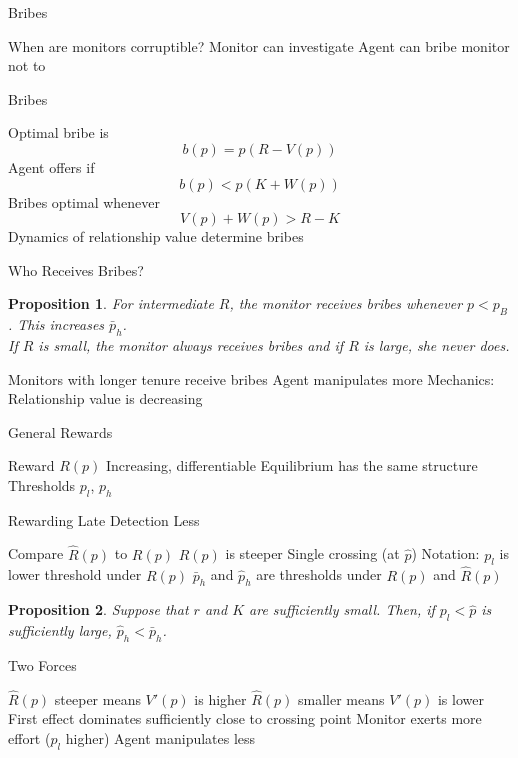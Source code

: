 \documentclass[usenames,dvipsnames]{beamer}
\newcommand{\bo}{\begin{outline}}
\newcommand{\eo}{\end{outline}}
\newtheorem{proposition}{Proposition}
\begin{document}
\begin{frame}{Bribes}
\bo
\1 When are monitors corruptible? 
\1 Monitor can investigate
\1 Agent can bribe monitor not to 
\eo
\bigskip

\end{frame}

\begin{frame}{Bribes}
\bo
\1 Optimal bribe is
\[
b(p) = p(R-V(p))
\]
\1 Agent offers if
\[
b(p) < p(K+W(p))
\]
\1 Bribes optimal whenever
\[
V(p)+W(p) > R-K
\]
\1 Dynamics of relationship value determine bribes
\eo
\end{frame}

\begin{frame}{Who Receives Bribes?}
\begin{proposition}
        For intermediate $R$, the monitor receives bribes whenever $p<p_B$. This increases $\bar{p}_h$. \\
        If $R$ is small, the monitor always receives bribes and if $R$ is large, she never does.
\end{proposition}
\bo
\1 Monitors with longer tenure receive bribes
\1 Agent manipulates more 
\1 Mechanics: Relationship value is decreasing
\eo

\end{frame}


\begin{frame}{General Rewards}
\bo
\1 Reward $R(p)$
\1 Increasing, differentiable
\1 Equilibrium has the same structure
\2 Thresholds $p_l$, $p_h$
\eo

\end{frame}

\begin{frame}{Rewarding Late Detection Less}
\bo
\1 Compare $\hat{R}(p)$ to $R(p)$
\1 $\hat{R}(p)$ is steeper
\1  Single crossing (at $\hat{p}$)
\1 Notation: 
\2 $p_l$ is lower threshold under $R(p)$
\2 $\bar{p}_h$ and $\hat{p}_h$ are thresholds under $R(p)$ and $\hat{R}(p)$
\eo
\begin{proposition}
        \label{prop:General-Rewards-Less-Manipulation}Suppose that $r$ and $K$ are sufficiently small. Then, if $p_l<\hat{p}$ is sufficiently large, $\hat{p}_h<\bar{p}_h$.
\end{proposition}
\end{frame}

\begin{frame}{Two Forces}
\bo
\1 $\hat{R}(p)$ steeper means $V'(p)$ is higher
\1 $\hat{R}(p)$ smaller means $V'(p)$ is lower
\1 First effect dominates sufficiently close to crossing point
\1 Monitor exerts more effort ($p_l$ higher)
\1 Agent manipulates less
\eo
\end{frame}
\end{document}
